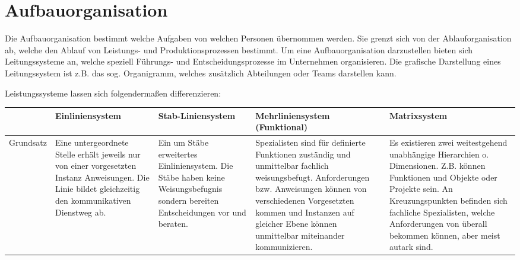 \section{Aufbauorganisation}
Die Aufbauorganisation bestimmt welche Aufgaben von welchen Personen übernommen werden. Sie grenzt sich von der Ablauforganisation ab, welche den Ablauf von Leistungs- und Produktionsprozessen bestimmt. Um eine Aufbauorganisation darzustellen bieten sich Leitungssysteme an, welche speziell Führungs- und Entscheidungsprozesse im Unternehmen organisieren. Die grafische Darstellung eines Leitungssystem ist z.B. das sog. Organigramm, welches zusätzlich Abteilungen oder Teams darstellen kann.

Leistungssysteme lassen sich folgendermaßen differenzieren:

\begin{table}[H]
    \centering
    \begin{tabularx}{\textwidth}{|>{\raggedright\arraybackslash}l|>{\raggedright\arraybackslash}X|>{\raggedright\arraybackslash}X|>{\raggedright\arraybackslash}X|>{\raggedright\arraybackslash}X|}
        \hline
                   & Einliniensystem                                                                                                                                          & Stab-Liniensystem                                                                                                                 & Mehrliniensystem (Funktional)                                                                                                                                                                                                                             & Matrixsystem                                                                                                                                                                                                                                                        \\
        \hline
        Grundsatz  & Eine untergeordnete Stelle erhält jeweils nur von einer vorgesetzten Instanz Anweisungen. Die Linie bildet gleichzeitig den kommunikativen Dienstweg ab. & Ein um Stäbe erweitertes Einliniensystem. Die Stäbe haben keine Weisungsbefugnis sondern bereiten Entscheidungen vor und beraten. & Spezialisten sind für definierte Funktionen zuständig und unmittelbar fachlich weisungsbefugt. Anforderungen bzw. Anweisungen können von verschiedenen Vorgesetzten kommen und Instanzen auf gleicher Ebene können unmittelbar miteinander kommunizieren. & Es existieren zwei weitestgehend unabhängige Hierarchien o. Dimensionen. Z.B. können Funktionen und Objekte oder Projekte sein. An Kreuzungspunkten befinden sich fachliche Spezialisten, welche Anforderungen von überall bekommen können, aber meist autark sind. \\

\end{tabularx}
\end{table}
